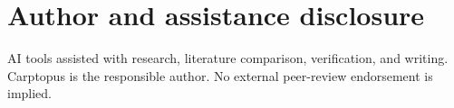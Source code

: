 \documentclass[11pt]{article}
\begin{document}
\section*{Author and assistance disclosure}

AI tools assisted with research, literature comparison, verification, and writing. Carptopus is the responsible author. No external peer-review endorsement is implied.
\end{document}
